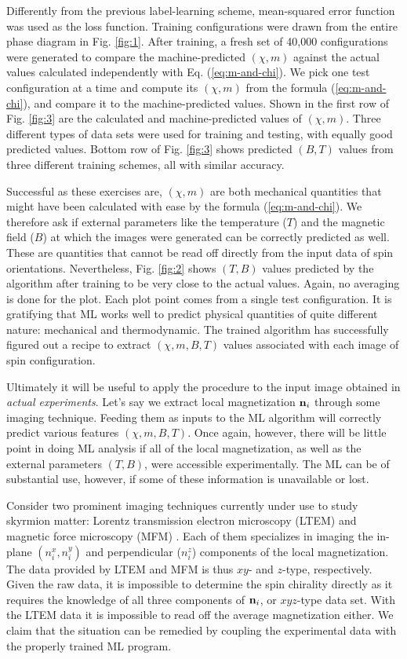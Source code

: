 \documentclass[reprint,amsmath,amssymb,aps,showpacs,superscriptaddress,prl]{revtex4-1}
\renewcommand{\v}[1]{{\bf #1}}
\begin{document}
Differently from the previous label-learning scheme,  mean-squared error function was used as the loss function. Training configurations were drawn from the entire phase diagram in Fig. \ref{fig:1}. After training, a fresh set of 40,000 configurations were generated to compare the machine-predicted $(\chi,m)$ against the actual values calculated independently with Eq. (\ref{eq:m-and-chi}). We pick one test configuration at a time and compute its $(\chi, m)$ from the formula (\ref{eq:m-and-chi}), and compare it to the machine-predicted values. Shown in the first row of Fig. \ref{fig:3} are the calculated and machine-predicted values of $(\chi, m)$. Three different types of data sets were used for training and testing, with equally good predicted values. Bottom row of Fig. \ref{fig:3} shows predicted $(B,T)$ values from three different training schemes, all with similar accuracy.

Successful as these exercises are, $(\chi, m)$ are both mechanical quantities that might have been calculated with ease by the formula (\ref{eq:m-and-chi}). We therefore ask if external parameters like the temperature ($T$) and the magnetic field ($B$) at which the images were generated can be correctly predicted as well. These are quantities that cannot be read off directly from the input data of spin orientations. Nevertheless, Fig. \ref{fig:2} shows $(T,B)$ values predicted by the algorithm after training to be very close to the actual values. Again, no averaging is done for the plot. Each plot point comes from a single test configuration. It is gratifying that ML works well to predict physical quantities of quite different nature: mechanical and thermodynamic. The trained algorithm has successfully figured out a recipe to extract $(\chi, m, B, T)$ values associated with each image of spin configuration.

Ultimately it will be useful to apply the procedure to the input image obtained in {\it actual experiments}. Let's say we extract local magnetization $\v n_i$ through some imaging technique. Feeding them as inputs to the ML algorithm will correctly predict various features $(\chi, m, B, T)$. Once again, however, there will be little point in doing ML analysis if all of the local magnetization, as well as the external parameters $(T,B)$, were accessible experimentally.  The ML can be of substantial use, however, if some of these information is unavailable or lost.

Consider two prominent imaging techniques currently under use to study skyrmion matter: Lorentz transmission electron microscopy (LTEM) \cite{tokura10} and magnetic force microscopy (MFM) \cite{pana17}. Each of them specializes in imaging the in-plane $(n^x_i , n^y_i )$ and perpendicular ($n^z_i$) components of the local magnetization. The data provided by LTEM and MFM is thus $xy$- and $z$-type, respectively.  Given the raw data, it is impossible to determine the spin chirality directly as it requires the knowledge of all three components of $\v n_i$, or $xyz$-type data set. With the LTEM data it is impossible to read off the average magnetization either. We claim that the situation can be remedied by coupling the experimental data with the properly trained ML program.
\end{document}
